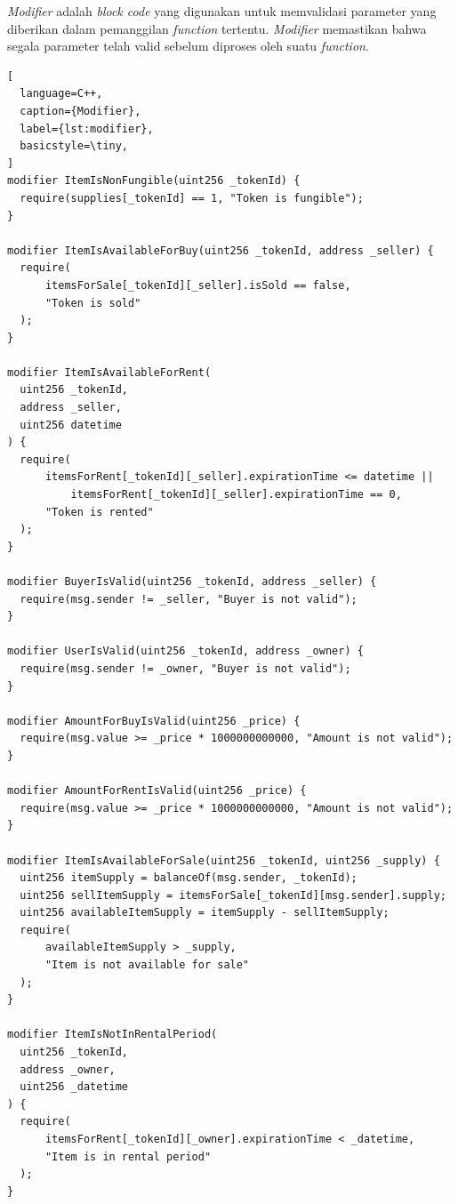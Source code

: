 \emph{Modifier} adalah \emph{block code} yang digunakan untuk memvalidasi parameter yang diberikan dalam pemanggilan \emph{function} tertentu. \emph{Modifier} memastikan bahwa segala parameter telah valid sebelum diproses oleh suatu \emph{function}.

\begin{lstlisting}[
  language=C++,
  caption={Modifier},
  label={lst:modifier},
  basicstyle=\tiny,
]
modifier ItemIsNonFungible(uint256 _tokenId) {
  require(supplies[_tokenId] == 1, "Token is fungible");
}

modifier ItemIsAvailableForBuy(uint256 _tokenId, address _seller) {
  require(
      itemsForSale[_tokenId][_seller].isSold == false,
      "Token is sold"
  );
}

modifier ItemIsAvailableForRent(
  uint256 _tokenId,
  address _seller,
  uint256 datetime
) {
  require(
      itemsForRent[_tokenId][_seller].expirationTime <= datetime ||
          itemsForRent[_tokenId][_seller].expirationTime == 0,
      "Token is rented"
  );
}

modifier BuyerIsValid(uint256 _tokenId, address _seller) {
  require(msg.sender != _seller, "Buyer is not valid");
}

modifier UserIsValid(uint256 _tokenId, address _owner) {
  require(msg.sender != _owner, "Buyer is not valid");
}

modifier AmountForBuyIsValid(uint256 _price) {
  require(msg.value >= _price * 1000000000000, "Amount is not valid");
}

modifier AmountForRentIsValid(uint256 _price) {
  require(msg.value >= _price * 1000000000000, "Amount is not valid");
}

modifier ItemIsAvailableForSale(uint256 _tokenId, uint256 _supply) {
  uint256 itemSupply = balanceOf(msg.sender, _tokenId);
  uint256 sellItemSupply = itemsForSale[_tokenId][msg.sender].supply;
  uint256 availableItemSupply = itemSupply - sellItemSupply;
  require(
      availableItemSupply > _supply,
      "Item is not available for sale"
  );
}

modifier ItemIsNotInRentalPeriod(
  uint256 _tokenId,
  address _owner,
  uint256 _datetime
) {
  require(
      itemsForRent[_tokenId][_owner].expirationTime < _datetime,
      "Item is in rental period"
  );
}
\end{lstlisting}

